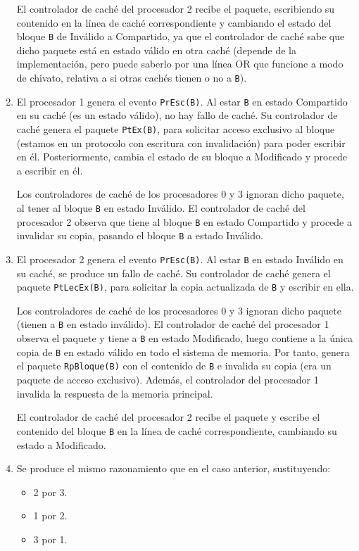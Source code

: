 \begin{ejercicio}
\begin{enumerate}
        El controlador de caché del procesador 2 recibe el paquete, escribiendo su contenido en la línea de caché correspondiente y cambiando el estado del bloque \verb|B| de Inválido a Compartido, ya que el controlador de caché sabe que dicho paquete está en estado válido en otra caché (depende de la implementación, pero puede saberlo por una línea OR que funcione a modo de chivato, relativa a si otras cachés tienen o no a \verb|B|).

    \item El procesador 1 genera el evento \verb|PrEsc(B)|. Al estar \verb|B| en estado Compartido en su caché (es un estado válido), no hay fallo de caché. Su controlador de caché genera el paquete \verb|PtEx(B)|, para solicitar acceso exclusivo al bloque (estamos en un protocolo con escritura con invalidación) para poder escribir en él. Posteriormente, cambia el estado de su bloque a Modificado y procede a escribir en él.

        Los controladores de caché de los procesadores 0 y 3 ignoran dicho paquete, al tener al bloque \verb|B| en estado Inválido. El controlador de caché del procesador 2 observa que tiene al bloque \verb|B| en estado Compartido y procede a invalidar su copia, pasando el bloque \verb|B| a estado Inválido.

    \item El procesador 2 genera el evento \verb|PrEsc(B)|. Al estar \verb|B| en estado Inválido en su caché, se produce un fallo de caché. Su controlador de caché genera el paquete \verb|PtLecEx(B)|, para solicitar la copia actualizada de \verb|B| y escribir en ella.

        Los controladores de caché de los procesadores 0 y 3 ignoran dicho paquete (tienen a \verb|B| en estado inválido). El controlador de caché del procesador 1 observa el paquete y tiene a \verb|B| en estado Modificado, luego contiene a la única copia de \verb|B| en estado válido en todo el sistema de memoria. Por tanto, genera el paquete \verb|RpBloque(B)| con el contenido de \verb|B| e invalida su copia (era un paquete de acceso exclusivo). Además, el controlador del procesador 1 invalida la respuesta de la memoria principal.

        El controlador de caché del procesador 2 recibe el paquete y escribe el contenido del bloque \verb|B| en la línea de caché correspondiente, cambiando su estado a Modificado.
    
    \item Se produce el mismo razonamiento que en el caso anterior, sustituyendo:
        \begin{itemize}
            \item 2 por 3.
            \item 1 por 2.
            \item 3 por 1.
        \end{itemize}
\end{enumerate}

\end{ejercicio}

